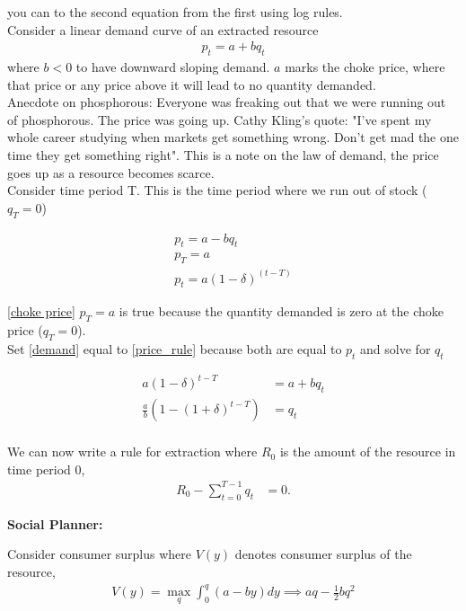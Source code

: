 \documentclass[12pt]{article}
\begin{document}
you can to the second equation from the first using log rules. \\

Consider a linear demand curve of an extracted resource
\begin{align}
    p_t = a + b q_t \label{demand}
\end{align}
where $b < 0$ to have downward sloping demand. $a$ marks the choke price, where that price or any price above it will lead to no quantity demanded. \\

Anecdote on phosphorous: Everyone was freaking out that we were running out of phosphorous. The price was going up. Cathy Kling's quote: "I've spent my whole career studying when markets get something wrong. Don't get mad the one time they get something right". This is a note on the law of demand, the price goes up as a resource becomes scarce. \\

Consider time period T. This is the time period where we run out of stock ($q_T = 0$)

\begin{align}
    p_t = a - bq_t\\
    p_T = a \label{choke price}\\ 
    p_t = a(1-\delta)^{(t-T)} \label{price_rule}
\end{align}

\ref{choke price} $p_T = a$ is true because the quantity demanded is zero at the choke price ($q_T = 0$). \\


Set \ref{demand} equal to \ref{price_rule} because both are equal to $p_t$ and solve for $q_t$

\begin{align}
    a(1-\delta)^{t-T} &= a + b q_t\\
    \frac{a}{b} (1 - (1+\delta)^{t-T}) &= q_t \label{quant_rule}\\
\end{align}

We can now write a rule for extraction where $R_0$ is the amount of the resource in time period 0,
\begin{align}
    R_0 - \sum_{t=0}^{T-1}q_t &= 0.
\end{align}

\textbf{Social Planner:}

Consider consumer surplus where $V(y)$ denotes consumer surplus of the resource,
\begin{align}
    V(y) = \max_q \int_0^q (a - by) dy \implies aq - \frac{1}{2}bq^2 \label{soc_plan}
\end{align}
\end{document}
